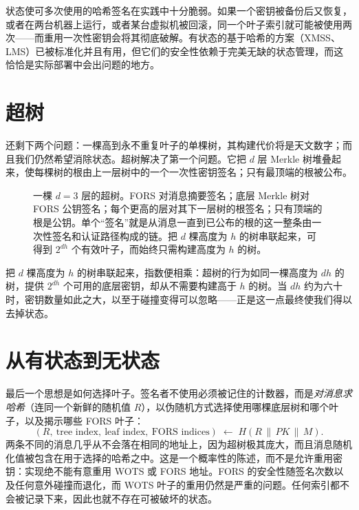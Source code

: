 \begin{remark}[为何状态是危险的]
状态使可多次使用的哈希签名在实践中十分脆弱。如果一个密钥被备份后又恢复，或者在两台机器上运行，或者某台虚拟机被回滚，同一个叶子索引就可能被使用两次——而重用一次性密钥会将其彻底破解。有状态的基于哈希的方案（XMSS、LMS）已被标准化并且有用，但它们的安全性依赖于完美无缺的状态管理，而这恰恰是实际部署中会出问题的地方。
\end{remark}

\section{超树}
还剩下两个问题：一棵高到永不重复叶子的单棵树，其构建代价将是天文数字；而且我们仍然希望消除状态。超树解决了第一个问题。它把 $d$ 层 Merkle 树堆叠起来，使每棵树的根由上一层树中的一个一次性密钥签名；只有最顶端的根被公布。

\begin{figure}[H]
\centering
{}
\caption{一棵 $d=3$ 层的超树。FORS 对消息摘要签名；底层 Merkle 树对 FORS 公钥签名；每个更高的层对其下一层树的根签名；只有顶端的根是公钥。单个“签名”就是从消息一直到已公布的根的这一整条由一次性签名和认证路径构成的链。把 $d$ 棵高度为 $h$ 的树串联起来，可得到 $2^{dh}$ 个有效叶子，而始终只需构建高度为 $h$ 的树。}
\label{fig:hypertree}
\end{figure}

把 $d$ 棵高度为 $h$ 的树串联起来，指数便相乘：超树的行为如同一棵高度为 $dh$ 的树，提供 $2^{dh}$ 个可用的底层密钥，却从不需要构建高于 $h$ 的树。当 $dh$ 约为六十时，密钥数量如此之大，以至于碰撞变得可以忽略——正是这一点最终使我们得以去掉状态。

\section{从有状态到无状态}
最后一个思想是如何选择叶子。签名者不使用必须被记住的计数器，而是\emph{对消息求哈希}（连同一个新鲜的随机值 $R$），以伪随机方式选择使用哪棵底层树和哪个叶子，以及揭示哪些 FORS 叶子：
\[
(R,\ \text{tree index},\ \text{leaf index},\ \text{FORS indices}) \;\longleftarrow\; H(R \,\|\, PK \,\|\, M).
\]
两条不同的消息几乎从不会落在相同的地址上，因为超树极其庞大，而且消息随机化值被包含在用于选择的哈希之中。这是一个概率性的陈述，而不是允许重用密钥：实现绝不能有意重用 WOTS 或 FORS 地址。FORS 的安全性随签名次数以及任何意外碰撞而退化，而 WOTS 叶子的重用仍然是严重的问题。任何索引都不会被记录下来，因此也就不存在可被破坏的状态。

